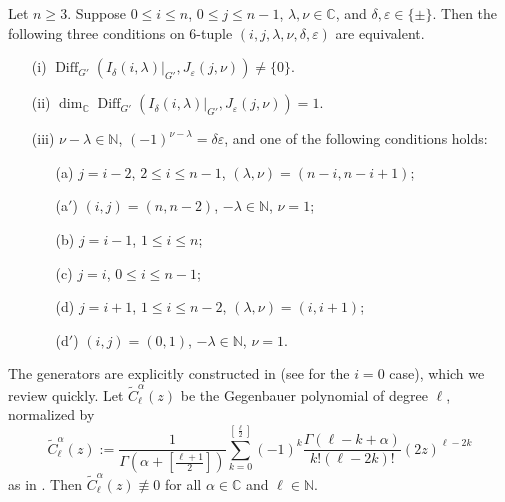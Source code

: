 \begin{fact}
\label{fact:2.7}
Let $n \ge 3$.  
Suppose $0 \le i \le n$, 
 $0 \le j \le n-1$, 
 $\lambda, \nu \in {\mathbb{C}}$, 
 and $\delta, \varepsilon \in \{ \pm \}$.  
Then the following three conditions on 6-tuple 
 $(i,j, \lambda,\nu,\delta, \varepsilon)$ are equivalent.  
\begin{enumerate}
\item[{\rm{(i)}}]
$
\operatorname{Diff}_{G'}(I_{\delta}(i,\lambda)|_{G'}, J_{\varepsilon}(j,\nu))\ne \{0\}$.  
\item[{\rm{(ii)}}]
$\dim_{\mathbb{C}} \operatorname{Diff}_{G'}(I_{\delta}(i,\lambda)|_{G'}, J_{\varepsilon}(j,\nu))=1$.  
\item[{\rm{(iii)}}]
$\nu-\lambda \in {\mathbb{N}}$, 
 $(-1)^{\nu-\lambda}=\delta \varepsilon$, 
 and one of the following conditions holds:
\begin{enumerate}
\item[{\rm{(a)}}]
$j=i-2$, 
$2 \le i \le n-1$, 
$(\lambda,\nu)=(n-i,n-i+1)$;
\item[{\rm{(a$'$)}}]
$(i,j)=(n,n-2)$, 
 $-\lambda \in {\mathbb{N}}$, 
 $\nu=1$;
\item[{\rm{(b)}}]
$j=i-1$, 
$1 \le i \le n$;
\item[{\rm{(c)}}]
$j=i$, 
$0 \le i \le n-1$;
\item[{\rm{(d)}}]
$j=i+1$, 
$1 \le i \le n-2$, 
$(\lambda,\nu)=(i,i+1)$;
\item[{\rm{(d$'$)}}]
$(i,j)=(0,1)$, 
 $-\lambda \in {\mathbb{N}}$, 
 $\nu=1$.  
\end{enumerate}
\end{enumerate} 
\end{fact}



The generators are explicitly constructed
 in \cite[(2.24)--(2.32)]{KKP}
(see \cite{Juhl, KOSS, sbon} for the $i=0$ case), 
 which we review quickly.  
Let $\widetilde C_{\ell}^{\alpha}(z)$ 
be the 
Gegenbauer polynomial of degree $\ell$, 
 normalized by
\begin{equation}
\label{eqn:Gegen}
\widetilde C_{\ell}^{\alpha}(z)
:=
\frac{1}{\Gamma(\alpha + [\frac{\ell+1}{2}])}
\sum_{k=0}^{[\frac \ell 2]}
(-1)^k
\frac{\Gamma(\ell-k+\alpha)}{k! (\ell-2k)!}
(2 z)^{\ell-2k}
\end{equation}
 as in \cite[(14.3)]{KKP}.  
Then $\widetilde C_{\ell}^{\alpha}(z) \not \equiv 0$
 for all $\alpha \in {\mathbb{C}}$
 and $\ell \in {\mathbb{N}}$.  



